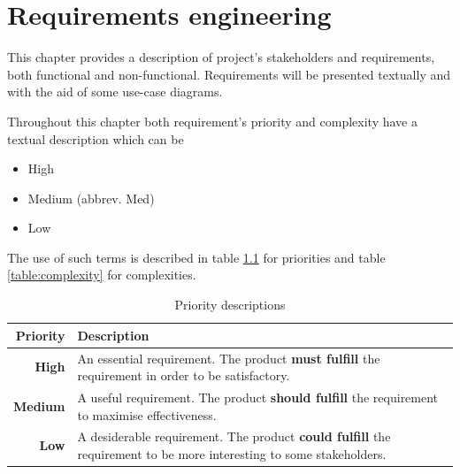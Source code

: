 
\chapter{Requirements engineering}

\label{ch:requirements}

This chapter provides a description of project's stakeholders and requirements, both functional and non-functional. 
Requirements will be presented textually and with the aid of some use-case diagrams. 

Throughout this chapter both requirement's priority and complexity have a textual description which can be
\begin{itemize}
\item High
\item Medium (abbrev. Med)
\item Low
\end{itemize}

The use of such terms is described in table \ref{table:priorities} for priorities
and table \ref{table:complexity} for complexities.
\begin{table}[h]
\begin{center}
\begin{tabular}{ | r | p{11.5cm} | }
  \hline
  \textbf{Priority} & \textbf{Description} \\
  \hline\noalign{\smallskip}\noalign{\smallskip}\hline
  \textbf{High} & An essential requirement.\newline
  The product \textbf{must fulfill} the requirement in order to be satisfactory. \\
  \textbf{Medium} & A useful requirement.\newline
  The product \textbf{should fulfill} the requirement to maximise effectiveness. \\
  \textbf{Low} & A desiderable requirement.\newline
  The product \textbf{could fulfill} the requirement to be more interesting to some stakeholders. \\
  \hline
\end{tabular}
\end{center}
\caption{Priority descriptions}
\label{table:priorities}
\end{table}

